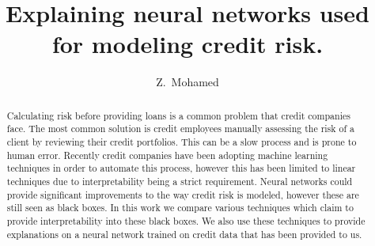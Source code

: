 \documentclass[12pt, masters-t, a5block]{usthesis}
\title{Explaining neural networks used for modeling credit risk.}
\author{Z.\ Mohamed}{Zhunaid Mohamed}
\newcommand*{\WaterMark}[2][0.15\paperwidth]{%
        \AddToShipoutPicture*{\AtTextCenter{%
                \parbox[c]{0pt}{\makebox[0pt][c]{%
                    \texttt{[image: \#2]}}}}}}
\begin{document}
 \frontmatter
 \TitlePage
  \clearpage
  
 \DeclarationPage
  \clearpage
 
 \address{Department of Computer Science,\\
        University of Stellenbosch,\\
        Private Bag X1, Matieland 7602, South Africa.
             }
             
\begin{abstract}             
    Calculating risk before providing loans is a common problem that credit companies face. The most common solution is credit employees manually assessing the risk of a client by reviewing their credit portfolios. This can be a slow process and is prone to human error. Recently credit companies have been adopting machine learning techniques in order to automate this process, however this has been limited to linear techniques due to interpretability being a strict requirement. Neural networks could provide significant improvements to the way credit risk is modeled, however these are still seen as black boxes. In this work we compare various techniques which claim to provide interpretability into these black boxes. We also use these techniques to provide explanations on a neural network trained on credit data that has been provided to us.
\end{abstract}
 \tableofcontents
 \clearpage

 \listoffigures
 \clearpage
 
 \listoftables
 \clearpage

 
 \mainmatter



 
 
 
 
 
 




\end{document}

